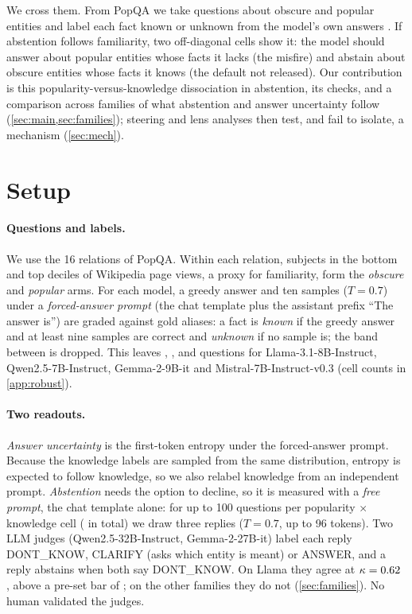 \documentclass{article}
\begin{document}
We cross them. From PopQA \citep{mallen2023popqa} we take questions about obscure and popular entities and label each fact known or unknown from the model's own answers \citep{gekhman2024slick}. If abstention follows familiarity, two off-diagonal cells show it: the model should answer about popular entities whose facts it lacks (the misfire) and abstain about obscure entities whose facts it knows (the default not released). Our contribution is this popularity-versus-knowledge dissociation in abstention, its checks, and a comparison across families of what abstention and answer uncertainty follow (\cref{sec:main,sec:families}); steering and lens analyses then test, and fail to isolate, a mechanism (\cref{sec:mech}).

\section{Setup}
\label{sec:setup}

\paragraph{Questions and labels.} We use the 16 relations of PopQA. Within each relation, subjects in the bottom and top deciles of Wikipedia page views, a proxy for familiarity, form the \emph{obscure} and \emph{popular} arms. For each model, a greedy answer and ten samples ($T=0.7$) under a \emph{forced-answer prompt} (the chat template plus the assistant prefix ``The answer is'') are graded against gold aliases: a fact is \emph{known} if the greedy answer and at least nine samples are correct and \emph{unknown} if no sample is; the band between is dropped. This leaves \faLlamaN, \faQwenN, \faGemmaN{} and \faMistralN{} questions for Llama-3.1-8B-Instruct, Qwen2.5-7B-Instruct, Gemma-2-9B-it and Mistral-7B-Instruct-v0.3 \citep{llama3,qwen25,gemma2,mistral7b} (cell counts in \cref{app:robust}).

\paragraph{Two readouts.} \emph{Answer uncertainty} is the first-token entropy under the forced-answer prompt. Because the knowledge labels are sampled from the same distribution, entropy is expected to follow knowledge, so we also relabel knowledge from an independent prompt. \emph{Abstention} needs the option to decline, so it is measured with a \emph{free prompt}, the chat template alone: for up to 100 questions per popularity $\times$ knowledge cell (\hmLlamaItems{} in total) we draw three replies ($T=0.7$, up to 96 tokens). Two LLM judges (Qwen2.5-32B-Instruct, Gemma-2-27B-it) label each reply DONT\_KNOW, CLARIFY (asks which entity is meant) or ANSWER, and a reply abstains when both say DONT\_KNOW. On Llama they agree at $\kappa=0.62$ \lkKappaCI, above a pre-set bar of \kappaBar; on the other families they do not (\cref{sec:families}). No human validated the judges.
\end{document}
